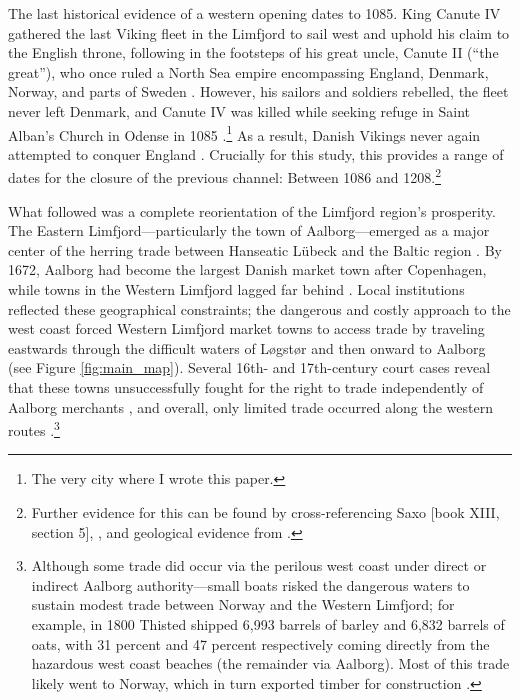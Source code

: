 \documentclass[12pt]{article}
\begin{document}
The last historical evidence of a western opening dates to 1085. King Canute IV gathered the last Viking fleet in the Limfjord to sail west and uphold his claim to the English throne, following in the footsteps of his great uncle, Canute II (“the great”), who once ruled a North Sea empire encompassing England, Denmark, Norway, and parts of Sweden \citep{Spejlborg2012}. However, his sailors and soldiers rebelled, the fleet never left Denmark, and Canute IV was killed while seeking refuge in Saint Alban’s Church in Odense in 1085 \citep{Pajung2012}.\footnote{The very city where I wrote this paper.} As a result, Danish Vikings never again attempted to conquer England \citep{Roesdahl2009}. Crucially for this study, this provides a range of dates for the closure of the previous channel: Between 1086 and 1208.\footnote{Further evidence for this can be found by cross-referencing Saxo \cite{saxo} [book XIII, section 5], \cite{Mortensen2018}, and geological evidence from \cite{Christensen2004}.}

What followed was a complete reorientation of the Limfjord region’s prosperity. The Eastern Limfjord—particularly the town of Aalborg—emerged as a major center of the herring trade between Hanseatic Lübeck and the Baltic region \citep{sildeboom2022}. By 1672, Aalborg had become the largest Danish market town after Copenhagen, while towns in the Western Limfjord lagged far behind \citep{Degn1989}. Local institutions reflected these geographical constraints; the dangerous and costly approach to the west coast forced Western Limfjord market towns to access trade by traveling eastwards through the difficult waters of Løgstør and then onward to Aalborg (see Figure \ref{fig:main_map}). Several 16th- and 17th-century court cases reveal that these towns unsuccessfully fought for the right to trade independently of Aalborg merchants \citep[pp. 78-89]{ThistedLokalhistorie1974}, and overall, only limited trade occurred along the western routes \citep{Poulsen2019}.\footnote{Although some trade did occur via the perilous west coast under direct or indirect Aalborg authority—small boats risked the dangerous waters to sustain modest trade between Norway and the Western Limfjord; for example, in 1800 Thisted shipped 6,993 barrels of barley and 6,832 barrels of oats, with 31 percent and 47 percent respectively coming directly from the hazardous west coast beaches (the remainder via Aalborg). Most of this trade likely went to Norway, which in turn exported timber for construction \citep[p. 30, p. 234]{Aagard1802, Christensen1735}.}
\end{document}
